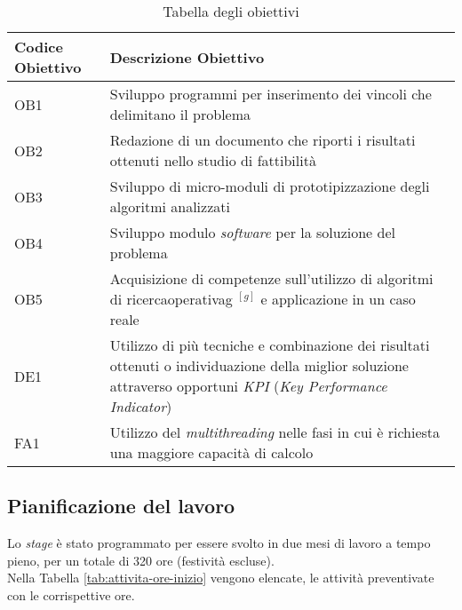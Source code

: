 \begin{center}
    \begin{longtable}{m{3cm}m{9cm}}
    \caption{Tabella degli obiettivi}
    \label{tab:obiettivi}
    \\ \hline
    \centering \textbf{Codice Obiettivo} & \centering \textbf{Descrizione Obiettivo} \arraybackslash \\
    \hline
    \centering OB1 & Sviluppo programmi per inserimento
    dei vincoli che delimitano il problema \arraybackslash \\
    \hline
    \centering OB2 & Redazione di un documento che riporti
    i risultati ottenuti nello studio di fattibilità \arraybackslash \\
    \hline
    \centering OB3 & Sviluppo di micro-moduli di prototipizzazione degli algoritmi analizzati \arraybackslash \\
    \hline
    \centering OB4 & Sviluppo modulo \textit{software} per
    la soluzione del problema \arraybackslash \\
    \hline
    \centering OB5 & Acquisizione di competenze sull’utilizzo
    di algoritmi di \gls{ricercaoperativag} $^{[g]}$ e
    applicazione in un caso reale \arraybackslash \\
    \hline
    \centering DE1 & Utilizzo di più tecniche e combinazione dei risultati
    ottenuti o individuazione della miglior soluzione attraverso
    opportuni \textit{KPI} (\textit{Key Performance Indicator}) \arraybackslash \\
    \hline
    \centering FA1 & Utilizzo del \textit{multithreading}
    nelle fasi in cui è richiesta una
    maggiore capacità di calcolo \arraybackslash \\
    \hline
    \end{longtable}
\end{center}%

\subsection{Pianificazione del lavoro}
\label{sec:pianificazione-lavoro}
\noindent Lo \textit{stage} è stato programmato per essere svolto in due mesi di lavoro
a tempo pieno, per un totale di 320 ore (festività escluse).\\
\noindent Nella Tabella \ref{tab:attivita-ore-inizio} vengono elencate,
le attività preventivate con le corrispettive ore.

\renewcommand{\arraystretch}{1.55}

